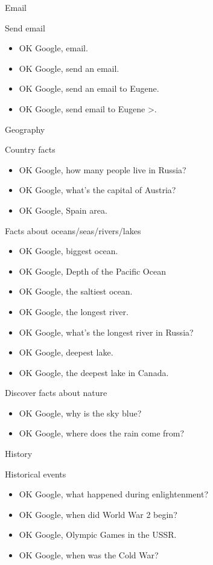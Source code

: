 \documentclass[
  a4paper,
]{article}
\begin{document}
Email

Send email

\begin{itemize}
\item
  OK Google, email.
\item
  OK Google, send an email.
\item
  OK Google, send an email to Eugene.
\item
  OK Google, send email to Eugene \textgreater.
\end{itemize}

Geography~~

Country facts

\begin{itemize}
\item
  OK Google, how many people live in Russia?
\item
  OK Google, what's the capital of Austria?
\item
  OK Google, Spain area.
\end{itemize}

Facts about oceans/seas/rivers/lakes

\begin{itemize}
\item
  OK Google, biggest ocean.
\item
  OK Google, Depth of the Pacific Ocean
\item
  OK Google, the saltiest ocean.
\item
  OK Google, the longest river.
\item
  OK Google, what's the longest river in Russia?
\item
  OK Google, deepest lake.
\item
  OK Google, the deepest lake in Canada.
\end{itemize}

Discover facts about nature

\begin{itemize}
\item
  OK Google, why is the sky blue?
\item
  OK Google, where does the rain come from?
\end{itemize}

History

Historical events

\begin{itemize}
\item
  OK Google, what happened during enlightenment?
\item
  OK Google, when did World War 2 begin?
\item
  OK Google, Olympic Games in the USSR.
\item
  OK Google, when was the Cold War?
\end{itemize}
\end{document}
